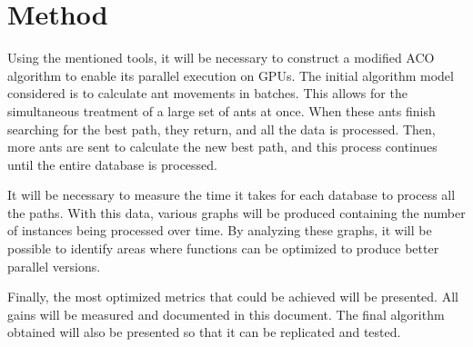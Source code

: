\section{Method} \label{Method}

Using the mentioned tools, it will be necessary to construct a modified ACO algorithm to enable its parallel execution on GPUs. The initial algorithm model considered is to calculate ant movements in batches. This allows for the simultaneous treatment of a large set of ants at once. When these ants finish searching for the best path, they return, and all the data is processed. Then, more ants are sent to calculate the new best path, and this process continues until the entire database is processed.

It will be necessary to measure the time it takes for each database to process all the paths. With this data, various graphs will be produced containing the number of instances being processed over time. By analyzing these graphs, it will be possible to identify areas where functions can be optimized to produce better parallel versions.

Finally, the most optimized metrics that could be achieved will be presented. All gains will be measured and documented in this document. The final algorithm obtained will also be presented so that it can be replicated and tested.
